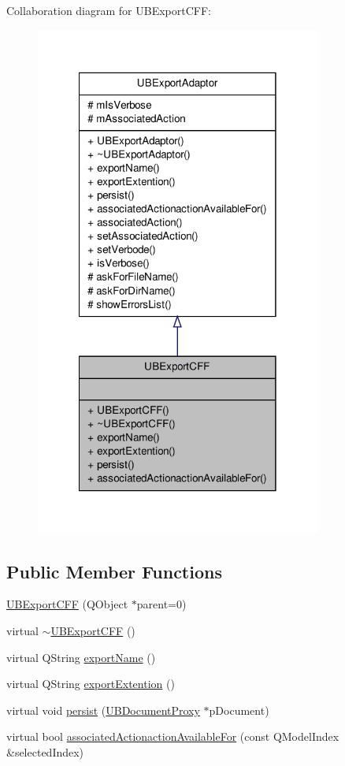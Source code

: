Collaboration diagram for U\-B\-Export\-C\-F\-F\-:
\nopagebreak
\begin{figure}[H]
\begin{center}
\leavevmode
\includegraphics[width=266pt]{d9/d90/class_u_b_export_c_f_f__coll__graph}
\end{center}
\end{figure}
\subsection*{Public Member Functions}
\begin{DoxyCompactItemize}
\item 
\hyperlink{class_u_b_export_c_f_f_af318c87816274ea88f8ed6bdf34902d2}{U\-B\-Export\-C\-F\-F} (Q\-Object $\ast$parent=0)
\item 
virtual \hyperlink{class_u_b_export_c_f_f_aefc5b05644b7366338212bf045d10359}{$\sim$\-U\-B\-Export\-C\-F\-F} ()
\item 
virtual Q\-String \hyperlink{class_u_b_export_c_f_f_a2d9281d58c63807d7c2dfde364388757}{export\-Name} ()
\item 
virtual Q\-String \hyperlink{class_u_b_export_c_f_f_aea3668eb65d00460e495d56c42b436da}{export\-Extention} ()
\item 
virtual void \hyperlink{class_u_b_export_c_f_f_aa7f031dc0cbe1f50f93bcb5e12c7151c}{persist} (\hyperlink{class_u_b_document_proxy}{U\-B\-Document\-Proxy} $\ast$p\-Document)
\item 
virtual bool \hyperlink{class_u_b_export_c_f_f_a8d731bb3ddbb49ae5f7fb348acb30e81}{associated\-Actionaction\-Available\-For} (const Q\-Model\-Index \&selected\-Index)
\end{DoxyCompactItemize}
